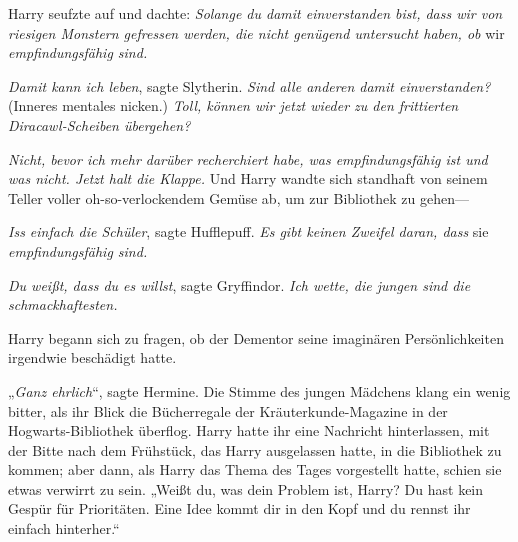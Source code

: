 Harry seufzte auf und dachte: \emph{Solange du damit einverstanden bist, dass wir von riesigen Monstern gefressen werden, die nicht genügend untersucht haben, ob} wir \emph{empfindungsfähig sind.}

\emph{Damit kann ich leben}, sagte Slytherin. \emph{Sind alle anderen damit einverstanden?} (Inneres mentales nicken.) \emph{Toll, können wir jetzt wieder zu den frittierten} \emph{Diracawl-Scheiben übergehen?}

\emph{Nicht, bevor ich mehr darüber recherchiert habe, was empfindungsfähig ist und was nicht. Jetzt halt die Klappe.} Und Harry wandte sich standhaft von seinem Teller voller oh-so-verlockendem Gemüse ab, um zur Bibliothek zu gehen—

\emph{Iss einfach die Schüler}, sagte Hufflepuff. \emph{Es gibt keinen Zweifel daran, dass} sie \emph{empfindungsfähig sind.}

\emph{Du weißt, dass du es willst}, sagte Gryffindor. \emph{Ich wette, die jungen sind die schmackhaftesten.}

Harry begann sich zu fragen, ob der Dementor seine imaginären Persönlichkeiten irgendwie beschädigt hatte.

\later

„\emph{Ganz ehrlich}“, sagte Hermine. Die Stimme des jungen Mädchens klang ein wenig bitter, als ihr Blick die Bücherregale der Kräuterkunde-Magazine in der Hogwarts-Bibliothek überflog. Harry hatte ihr eine Nachricht hinterlassen, mit der Bitte nach dem Frühstück, das Harry ausgelassen hatte, in die Bibliothek zu kommen; aber dann, als Harry das Thema des Tages vorgestellt hatte, schien sie etwas verwirrt zu sein.
„Weißt du, was dein Problem ist, Harry? Du hast kein Gespür für Prioritäten. Eine Idee kommt dir in den Kopf und du rennst ihr einfach hinterher.“

